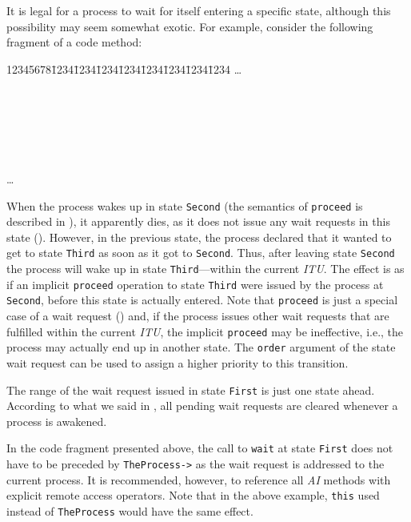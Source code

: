 It is legal for a process to wait for itself entering a specific state,
although this possibility may seem somewhat exotic.
For example, consider the following fragment of a code method:
{\tt\begin{tabbing}
12345678\=1234\=1234\=1234\=1234\=1234\=1234\=1234\=1234\kill
\>\ldots \\
 \\
\> \\
\> \\
 \\
\>  \\
 \\
\> \ldots \\
\end{tabbing}}
When the process wakes up in state {\tt Second} (the semantics of {\tt proceed}
is described in ), it apparently dies, as it does not issue any
wait requests in this state ().
However, in the previous state, the process declared that it wanted to get to
state {\tt Third} as soon as it got to {\tt Second}.
Thus, after leaving state {\tt Second} the process will wake up in state
{\tt Third}---within the current {\em ITU}.
The effect is as if an implicit
{\tt proceed} operation to state {\tt Third} were
issued by the process at {\tt Second}, before this state is actually
entered.
Note that {\tt proceed} is just a special case of a wait request
() and, if the process issues other wait requests that are
fulfilled within the current {\em ITU}, the implicit {\tt proceed} may
be ineffective, i.e., the process may actually end up in another state.
The {\tt order} argument of the state wait request can be used to assign
a higher priority to this transition.

The range of the wait request issued in state {\tt First} is just
one state ahead.
According to what we said in ,
all pending wait requests are cleared whenever a process is awakened.

In the code fragment presented above, the call to {\tt wait} at
state {\tt First} does not have to be preceded by {\tt TheProcess->} as
the wait request is addressed to the current process.
It is recommended, however, to reference all {\em AI\/} methods with
explicit remote access operators.
Note that in the above example,
{\tt this\/} used instead of {\tt TheProcess} would have the same
effect.

